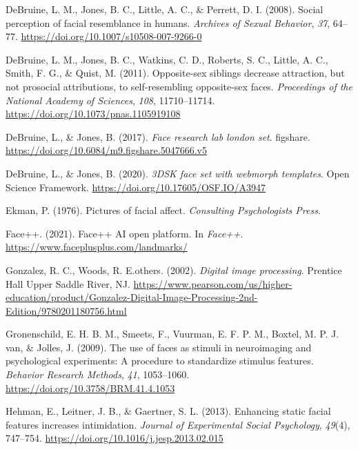 \documentclass[
  doc,floatsintext]{apa6}
\newlength{\cslhangindent}
\newlength{\cslentryspacingunit} %
\newenvironment{CSLReferences}[2] %
 {%
  \setlength{\parindent}{0pt}
  \ifodd #1
  \let\oldpar\par
  \def\par{\hangindent=\cslhangindent\oldpar}
  \fi
  \setlength{\parskip}{#2\cslentryspacingunit}
 }%
 {}
\begin{document}
\begin{CSLReferences}{1}{0}
\leavevmode{}%
DeBruine, L. M., Jones, B. C., Little, A. C., \& Perrett, D. I. (2008). Social perception of facial resemblance in humans. \emph{Archives of Sexual Behavior}, \emph{37}, 64--77. \url{https://doi.org/10.1007/s10508-007-9266-0}

\leavevmode{}%
DeBruine, L. M., Jones, B. C., Watkins, C. D., Roberts, S. C., Little, A. C., Smith, F. G., \& Quist, M. (2011). Opposite-sex siblings decrease attraction, but not prosocial attributions, to self-resembling opposite-sex faces. \emph{Proceedings of the National Academy of Sciences}, \emph{108}, 11710--11714. \url{https://doi.org/10.1073/pnas.1105919108}

\leavevmode{}%
DeBruine, L., \& Jones, B. (2017). \emph{Face research lab london set}. figshare. \url{https://doi.org/10.6084/m9.figshare.5047666.v5}

\leavevmode{}%
DeBruine, L., \& Jones, B. (2020). \emph{3DSK face set with webmorph templates}. Open Science Framework. \url{https://doi.org/10.17605/OSF.IO/A3947}

\leavevmode{}%
Ekman, P. (1976). Pictures of facial affect. \emph{Consulting Psychologists Press}.

\leavevmode{}%
Face++. (2021). Face++ AI open platform. In \emph{Face++}. \url{https://www.faceplusplus.com/landmarks/}

\leavevmode{}%
Gonzalez, R. C., Woods, R. E.others. (2002). \emph{Digital image processing}. Prentice Hall Upper Saddle River, NJ. \url{https://www.pearson.com/us/higher-education/product/Gonzalez-Digital-Image-Processing-2nd-Edition/9780201180756.html}

\leavevmode{}%
Gronenschild, E. H. B. M., Smeets, F., Vuurman, E. F. P. M., Boxtel, M. P. J. van, \& Jolles, J. (2009). The use of faces as stimuli in neuroimaging and psychological experiments: A procedure to standardize stimulus features. \emph{Behavior Research Methods}, \emph{41}, 1053--1060. \url{https://doi.org/10.3758/BRM.41.4.1053}

\leavevmode{}%
Hehman, E., Leitner, J. B., \& Gaertner, S. L. (2013). Enhancing static facial features increases intimidation. \emph{Journal of Experimental Social Psychology}, \emph{49}(4), 747--754. \url{https://doi.org/10.1016/j.jesp.2013.02.015}


\end{CSLReferences}
\end{document}

